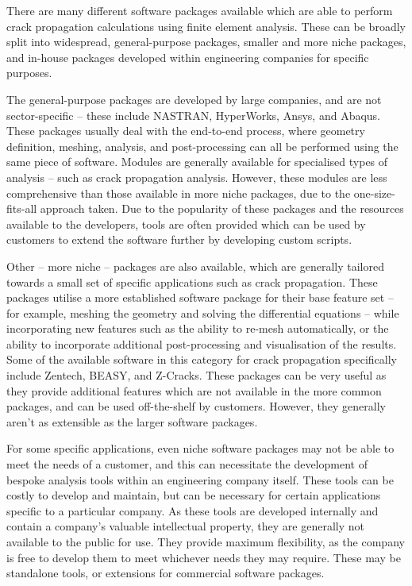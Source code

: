 There are many different software packages available which are able to perform crack propagation calculations using finite element analysis. These can be broadly split into  widespread, general-purpose packages, smaller and more niche packages, and in-house packages developed within engineering companies for specific purposes.

The general-purpose packages are developed by large companies, and are not sector-specific -- these include NASTRAN, HyperWorks, Ansys, and Abaqus. These packages usually deal with the end-to-end process, where geometry definition, meshing, analysis, and post-processing can all be performed using the same piece of software. Modules are generally available for specialised types of analysis -- such as crack propagation analysis. However, these modules are less comprehensive than those available in more niche packages, due to the one-size-fits-all approach taken. Due to the popularity of these packages and the resources available to the developers, tools are often provided which can be used by customers to extend the software further by developing custom scripts.

Other -- more niche -- packages are also available, which are generally tailored towards a small set of specific applications such as crack propagation. These packages utilise a more established software package for their base feature set -- for example, meshing the geometry and solving the differential equations -- while incorporating new features such as the ability to re-mesh automatically, or the ability to incorporate additional post-processing and visualisation of the results. Some of the available software in this category for crack propagation specifically include Zentech, BEASY, and Z-Cracks. These packages can be very useful as they provide additional features which are not available in the more common packages, and can be used off-the-shelf by customers. However, they generally aren't as extensible as the larger software packages.

For some specific applications, even niche software packages may not be able to meet the needs of a customer, and this can necessitate the development of bespoke analysis tools within an engineering company itself. These tools can be costly to develop and maintain, but can be necessary for certain applications specific to a particular company. As these tools are developed internally and contain a company's valuable intellectual property, they are generally not available to the public for use. They provide maximum flexibility, as the company is free to develop them to meet whichever needs they may require. These may be standalone tools, or extensions for commercial software packages.

